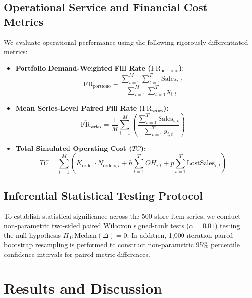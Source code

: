 \documentclass[11pt,a4paper]{article}
\begin{document}
\subsection{Operational Service and Financial Cost Metrics}
\label{sec:meth_metrics}
We evaluate operational performance using the following rigorously differentiated metrics:
\begin{itemize}
    \item \textbf{Portfolio Demand-Weighted Fill Rate ($\text{FR}_{\text{portfolio}}$):}
    \begin{equation}
    \text{FR}_{\text{portfolio}} = \frac{\sum_{i=1}^M \sum_{t=1}^T \text{Sales}_{i,t}}{\sum_{i=1}^M \sum_{t=1}^T y_{i,t}}
    \label{eq:weighted_fill_rate}
    \end{equation}
    \item \textbf{Mean Series-Level Paired Fill Rate ($\overline{\text{FR}}_{\text{series}}$):}
    \begin{equation}
    \overline{\text{FR}}_{\text{series}} = \frac{1}{M} \sum_{i=1}^M \left( \frac{\sum_{t=1}^T \text{Sales}_{i,t}}{\sum_{t=1}^T y_{i,t}} \right)
    \label{eq:series_fill_rate}
    \end{equation}
    \item \textbf{Total Simulated Operating Cost ($TC$):}
    \begin{equation}
    TC = \sum_{i=1}^M \left( K_{\text{order}} \cdot N_{\text{orders}, i} + h \sum_{t=1}^T OH_{i,t} + p \sum_{t=1}^T \text{LostSales}_{i,t} \right)
    \label{eq:total_cost}
    \end{equation}
\end{itemize}

\subsection{Inferential Statistical Testing Protocol}
\label{sec:meth_stats}
To establish statistical significance across the 500 store-item series, we conduct non-parametric two-sided paired Wilcoxon signed-rank tests ($\alpha = 0.01$) testing the null hypothesis $H_0: \text{Median}(\Delta) = 0$. In addition, 1,000-iteration paired bootstrap resampling is performed to construct non-parametric 95\% percentile confidence intervals for paired metric differences.

\section{Results and Discussion}
\label{sec:results}
\end{document}
